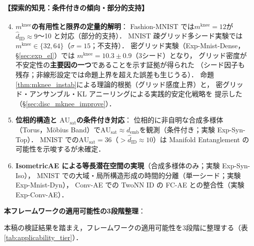 \documentclass[11pt,a4paper]{jsarticle}
\newcommand{\AUsat}{\mathrm{AU}_{\mathrm{sat}}}
\newcommand{\mknee}{m^{\mathrm{knee}}}
\newcommand{\demb}{d_{\mathrm{emb}}}
\begin{document}
\paragraph{【探索的知見：条件付きの傾向・部分的支持】}
\begin{enumerate}
  \setcounter{enumi}{3}
  \item \textbf{$\mknee$の有用性と限界の定量的解明}：
        Fashion-MNIST では$\mknee = 12$が$\hat{d}_\mathrm{ID} \approx 9$〜10 と対応（部分的支持）．
        MNIST 疎グリッド多シード実験では$\mknee \in \{32, 64\}$（$\sigma=15$；不支持）．
        密グリッド実験（Exp-Mnist-Dense，§\ref{sec:exp_el}）では
        $\mknee = 10.3 \pm 0.9$（3シード）となり，
        グリッド密度が不安定性の\textbf{主要因の一つ}であることを示す証拠が得られた
        （シード因子も残存；非線形設定では命題上界を超えた誤差も生じうる）．
        命題\ref{thm:mknee_instab}による理論的根拠（グリッド感度上界）と，
        密グリッド・アンサンブル・KL アニーリングによる実践的安定化戦略を
        提示した（§\ref{sec:disc_mknee_improve}）．
  \item \textbf{位相的構造と $\AUsat$の条件付き対応}：
        位相的に非自明な合成多様体（Torus，Möbius Band）で$\AUsat \approx \demb$を観測（条件付き；実験 Exp-Syn-Top）．
        MNIST での$\AUsat = 36$（$> \hat{d}_\mathrm{ID} \approx 10$）は Manifold Entanglement の可能性を示唆するが未確定．
  \item \textbf{IsometricAE による等長潜在空間の実現}（合成多様体のみ；実験 Exp-Syn-Iso），
        MNIST での大域・局所構造形成の時間的分離（単一シード；実験 Exp-Mnist-Dyn），
        Conv-AE での TwoNN ID の FC-AE との整合性（実験 Exp-Conv-AE）．
\end{enumerate}

\textbf{本フレームワークの適用可能性の3段階整理}：

本稿の検証結果を踏まえ，フレームワークの適用可能性を3段階に整理する（表\ref{tab:applicability_tier}）．
\end{document}
